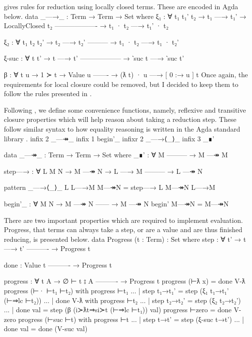 \documentclass[logo,bsc,singlespacing,parskip,online]{infthesis}
\renewenvironment{code}{\mintedcopy[breaklines,breaksymbolleft=\;]{agda}}{\endmintedcopy}
\begin{document}
\citet{chargueraud_locally_2012} gives rules for reduction using locally closed terms. These are
encoded in Agda below.
\begin{code}
data _—→_ : Term → Term → Set where
  ξ₁ : ∀ {t₁ t₁' t₂}
    → t₁ —→ t₁'
    → LocallyClosed t₂
      -------------------
    → t₁ · t₂ —→ t₁' · t₂

  ξ₂ : ∀ {t₁ t₂ t₂'}
    → t₂ —→ t₂'
      ---------
    → t₁ · t₂ —→ t₁ · t₂'

  ξ-suc : ∀ {t t'}
    → t —→ t'
      ------------------
    → ‵suc t —→ ‵suc t'

  β : ∀ {t u}
    → 1 ≻ t
    → Value u
      -------
    → (ƛ t) · u —→ [ 0 :→ u ] t
\end{code}
Once again, the requirements for local closure could be removed, but I decided to keep them to
follow the rules presented in \citet{chargueraud_locally_2012}.

Following \citet{wadler_programming_2022}, we define some convenience functions, namely, reflexive
and transitive closure properties which will help reason about taking a reduction step. These follow
similar syntax to how equality reasoning is written in the Agda standard library
\citep{the_agda_community_agda_2024}.
\begin{code}
infix  2 _—↠_
infix  1 begin'_
infixr 2 _—→⟨_⟩_
infix  3 _∎'

data _—↠_ : Term → Term → Set where
  _∎' : ∀ M
      ---------
    → M —↠ M

  step—→ : ∀ L {M N}
    → M —↠ N
    → L —→ M
      ---------
    → L —↠ N

pattern _—→⟨_⟩_ L L—→M M—↠N = step—→ L M—↠N L—→M

begin'_ : ∀ {M N}
  → M —↠ N
    ------
  → M —↠ N
begin' M—↠N = M—↠N
\end{code}

There are two important properties which are required to implement evaluation. Progress, that terms
can always take a step, or are a value and are thus finished reducing, is presented below.
\begin{code}
data Progress (t : Term) : Set where
  step : ∀ {t'}
    → t —→ t'
      ----------
    → Progress t

  done :
      Value t
      ----------
    → Progress t

progress : ∀ {t A}
  → ∅ ⊢ t ⦂ A
    ----------
  → Progress t
progress (⊢ƛ x) = done V-ƛ
progress (⊢· ⊢t₁ ⊢t₂) with progress ⊢t₁
... | step t₁→t₁' = step (ξ₁ t₁→t₁' (⊢⇒lc ⊢t₂))
... | done V-ƛ with progress ⊢t₂
...   | step t₂→t₂' = step (ξ₂ t₂→t₂')
...   | done val    = step (β (i≻ƛt⇒si≻t (⊢⇒lc ⊢t₁)) val)
progress ⊢zero = done V-zero
progress (⊢suc ⊢t) with progress ⊢t
... | step t→t' = step (ξ-suc t→t')
... | done val  = done (V-suc val)
\end{code}
\end{document}
